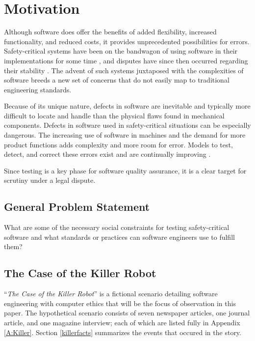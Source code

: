 \chapter{Motivation}\label{C:Motivation}

Although software does offer the benefits of added flexibility, increased
functionality, and reduced costs, it provides unprecedented possibilities for
errors. Safety-critical systems have been on the bandwagon of using software in
their implementations for some time \cite{Graupe78,Hurtig94}, and disputes have
since then occurred regarding their stability \cite{Leveson93,Maisel05}. The 
advent of such systems juxtaposed with the complexities of software breeds a new
set of concerns that do not easily map to traditional engineering standards.

Because of its unique nature, defects in software are inevitable and typically
more difficult to locate and handle than the physical flaws found in mechanical
components. Defects in software used in safety-critical situations can be
especially dangerous. The increasing use of software in machines and the demand
for more product functions adds complexity and more room for error. Models to
test, detect, and correct these errors exist and are continually improving
\cite{Parnas90}.

Since testing is a key phase for software quality assurance, it is a clear
target for scrutiny under a legal dispute.

\section{General Problem Statement}
What are some of the necessary social constraints for testing safety-critical
software and what standards or practices can software engineers use to fulfill
them?

\section{The Case of the Killer Robot}\label{killer}
``\textit{The Case of the Killer Robot}'' \cite{Epstein96} is a fictional  
scenario detailing software engineering with computer ethics that will be the
focus of observation in this paper. The hypothetical scenario consists of seven
newspaper articles, one journal article, and one magazine interview; each of
which are listed fully in Appendix \ref{A:Killer}. Section \ref{killerfacts}
summarizes the events that occured in the story.

